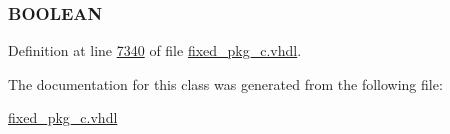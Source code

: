 \subsubsection[{xgood}]{ {\bfseries \textcolor{comment}{B\+O\+O\+L\+E\+A\+N}\textcolor{vhdlchar}{ }} \hspace{0.3cm}{\ttfamily [Shared Variable]}}\label{class__fixed__pkg_a73f9cce55faa4f1d41ba7ea34d447f88}


Definition at line \hyperlink{fixed__pkg__c_8vhdl_source_l07340}{7340} of file \hyperlink{fixed__pkg__c_8vhdl_source}{fixed\+\_\+pkg\+\_\+c.\+vhdl}.



The documentation for this class was generated from the following file\+:\begin{DoxyCompactItemize}
\item 
\hyperlink{fixed__pkg__c_8vhdl}{fixed\+\_\+pkg\+\_\+c.\+vhdl}\end{DoxyCompactItemize}
